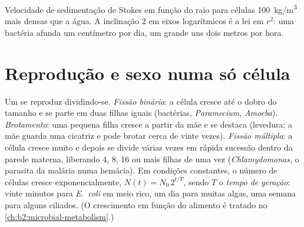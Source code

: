 \begin{omfigure}

{\small Velocidade de sedimentação de Stokes em função do raio para
células \qty{100}{kg/m^3} mais densas que a água. A inclinação 2 em
eixos logarítmicos é a lei em $r^2$: uma bactéria afunda um centímetro
por dia, um  grande uns dois metros por hora.}
\end{omfigure}

\section{Reprodução e sexo numa só célula}

\begin{definition}\label{def:b2:unicellular-diversity:division}
Um  se reproduz dividindo-se. \emph{Fissão
binária}: a célula cresce até o dobro do tamanho e se parte em duas
filhas iguais (bactérias, \emph{Paramecium}, \emph{Amoeba}).
\emph{Brotamento}: uma pequena filha cresce a partir da mãe e se
destaca (levedura; a mãe guarda uma cicatriz e pode brotar cerca de
vinte vezes). \emph{Fissão múltipla}: a célula cresce muito e depois
se divide várias vezes em rápida sucessão dentro da parede materna,
liberando 4, 8, 16 ou mais filhas de uma vez (\emph{Chlamydomonas}, o
parasita da malária numa hemácia). Em condições constantes, o número
de células cresce exponencialmente, $N(t) = N_0\,2^{t/T}$, sendo $T$ o
\emph{tempo de geração}: vinte minutos para
\emph{E.~coli} em meio rico, um dia para muitas algas, uma semana para
alguns ciliados. (O crescimento em função do alimento é tratado no
\cref{ch:b2:microbial-metabolism}.)
\end{definition}

